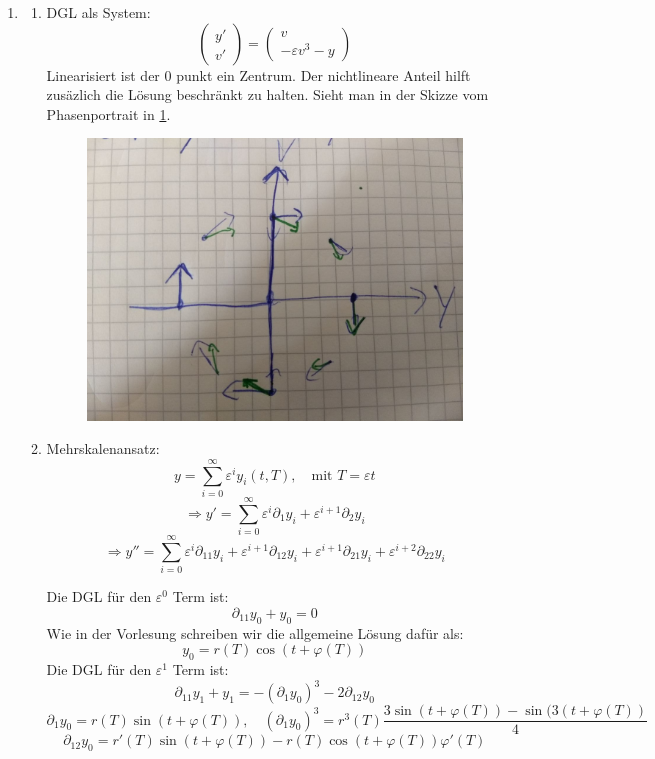 \documentclass[a4paper,11pt]{scrartcl}
\newcommand*{\eps}{\varepsilon}
\newcommand*{\sm}{\sum_{i=0}^\infty}
\begin{document}
\begin{enumerate}[label*=\textbf{9.\arabic*.}]

\item
  \begin{enumerate}
  \item
    DGL als System:
    \[\begin{pmatrix}y'\\v'\end{pmatrix}=
      \begin{pmatrix}v\\-\eps v^3 - y\end{pmatrix}
    \]
    Linearisiert ist der 0 punkt ein Zentrum.
    Der nichtlineare Anteil hilft zusäzlich die Lösung beschränkt zu halten.
    Sieht man in der Skizze vom Phasenportrait in \cref{fig:phaseportrait_9.1a}.

    \begin{figure}
    \centering
    \includegraphics[width=.5\linewidth]{1a.jpg}
    \label{fig:phaseportrait_9.1a}
    \end{figure}

  \item
    Mehrskalenansatz:
    \[ y = \sm \eps^i y_i(t, T), \quad \text{mit } T = \eps t \]
    \[ \Rightarrow y' = \sm \eps^i \partial_{1} y_i + \eps^{i+1} \partial_2 y_i\]
    \[ \Rightarrow y'' = \sm \eps^i \partial_{11} y_i + \eps^{i+1} \partial_{12}
      y_i + \eps^{i+1} \partial_{21} y_i + \eps^{i+2} \partial_{22} y_i\]

    Die DGL für den $\eps^0$ Term ist:
    \[ \partial_{11} y_0 + y_0 = 0\]
    Wie in der Vorlesung schreiben wir die allgemeine Lösung dafür als:
    \[ y_0 = r(T) \cos(t + \varphi(T))\]
    Die DGL für den $\eps^1$ Term ist:
    \[\partial_{11} y_1 + y_1 = - (\partial_1 y_0)^3 -2 \partial_{12} y_0\]
    \[\partial_1 y_0 = r(T) \sin(t+\varphi(T)), \quad (\partial_1 y_0)^3 =
      r^3(T) \frac{3 \sin(t + \varphi(T)) - \sin(3 (t + \varphi(T))}{4}\]
    \[\partial_{12} y_0 = r'(T) \sin(t+\varphi(T)) - r(T) \cos(t + \varphi(T)) \varphi'(T) \]


\end{enumerate}
\end{enumerate}
\end{document}

